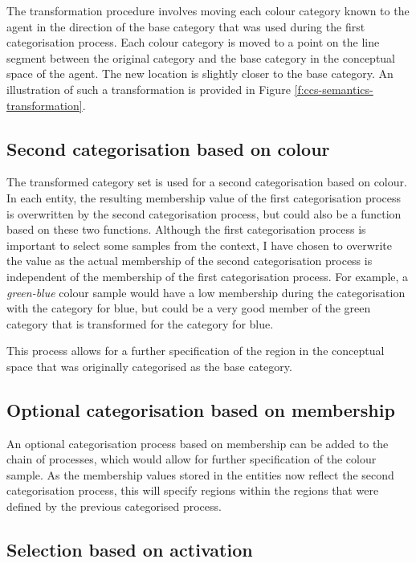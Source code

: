 The transformation procedure involves moving each colour category
known to the agent in the direction of the base category that was used
during the first categorisation process. Each colour category is moved
to a point on the line segment between the original category and the
base category in the conceptual space of the agent. The new location
is slightly closer to the base category. An illustration of such a
transformation is provided in Figure
\ref{f:ccs-semantics-transformation}.

\subsection{Second categorisation based on colour}

The transformed category set is used for a second categorisation based
on colour. In each entity, the resulting membership value of the first
categorisation process is overwritten by the second categorisation
process, but could also be a function based on these two
functions. Although the first categorisation process is important to
select some samples from the context, I have chosen to overwrite the
value as the actual membership of the second categorisation process
is independent of the membership of the first categorisation
process. For example, a \textit{green-blue} colour sample would have a low
membership during the categorisation with the category for blue, but
could be a very good member of the green category that is transformed
for the category for blue.

This process allows for a further specification of the region in the
conceptual space that was originally categorised as the base category.

\subsection{Optional categorisation based on membership}

An optional categorisation process based on membership can be added to
the chain of processes, which would allow for further specification of
the colour sample. As the membership values stored in the entities now
reflect the second categorisation process, this will specify regions
within the regions that were defined by the previous categorised
process.

\subsection{Selection based on activation}

